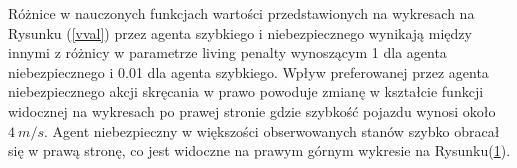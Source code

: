 \documentclass[12pt, oneside]{article}
\begin{document}
\begin{figure}[h]
    \label{dystrybucja}
\end{figure}
\newpage
Różnice w nauczonych funkcjach wartości przedstawionych na wykresach na Rysunku (\ref{vval}) przez agenta szybkiego i niebezpiecznego wynikają między innymi z różnicy w parametrze living penalty wynoszącym 1 dla agenta niebezpiecznego i 0.01 dla agenta szybkiego. Wpływ preferowanej przez agenta niebezpiecznego akcji skręcania w prawo powoduje zmianę w kształcie funkcji widocznej na wykresach po prawej stronie gdzie szybkość pojazdu wynosi około $4~m/s$. Agent niebezpieczny w większości obserwowanych stanów szybko obracał się w prawą stronę, co jest widoczne na prawym górnym wykresie na Rysunku(\ref{dystrybucja}).
\end{document}
